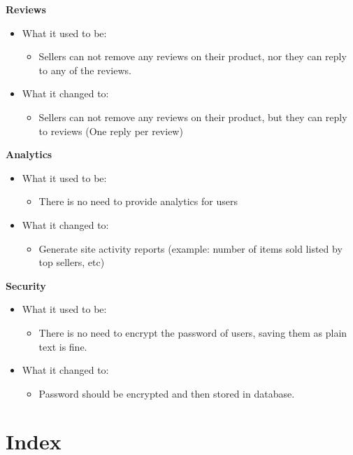 \documentclass[11pt]{article}
\newcounter{use case ID}
\begin{document}
\textbf{Reviews} \\
\begin{itemize}
    \item What it used to be:
        \begin{itemize}
            \item Sellers can not remove any reviews on their product, nor they can reply to any of the reviews.
        \end{itemize}
    \item What it changed to:
        \begin{itemize}
            \item Sellers can not remove any reviews on their product, but they can reply to reviews (One reply per review)
        \end{itemize}
\end{itemize}
\textbf{Analytics} \\
\begin{itemize}
    \item What it used to be:
        \begin{itemize}
            \item There is no need to provide analytics for users
        \end{itemize}
    \item What it changed to:
        \begin{itemize}
            \item Generate site activity reports (example: number of items sold listed by top sellers, etc)
        \end{itemize}
\end{itemize}
\textbf{Security} \\
\begin{itemize}
    \item What it used to be:
        \begin{itemize}
            \item There is no need to encrypt the password of users, saving them as plain text is fine.
        \end{itemize}
    \item What it changed to:
        \begin{itemize}
            \item Password should be encrypted and then stored in database.
        \end{itemize}
\end{itemize}

\section{Index}
\end{document}
